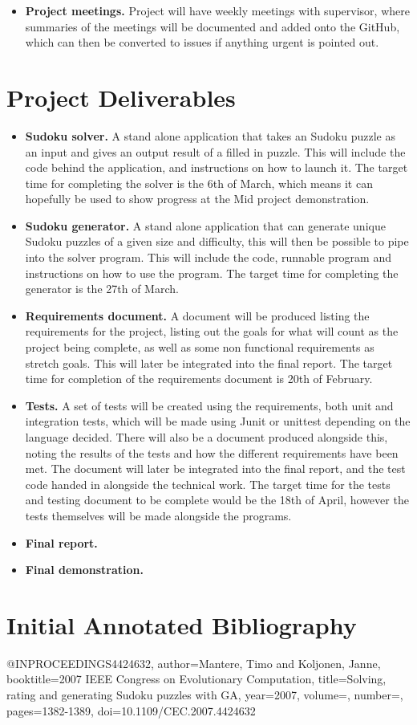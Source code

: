\documentclass[a4paper,10pt]{article}
\begin{document}
\begin{itemize}
\begin{itemize}
	\end{itemize} 
	\item \textbf{Project meetings.} Project will have weekly meetings with supervisor, where summaries of the meetings will be documented and added onto the GitHub, which can then be converted to issues if anything urgent is pointed out.
\end{itemize}
\section*{Project Deliverables}
\begin{itemize}
	\item \textbf{Sudoku solver.} A stand alone application that takes an Sudoku puzzle as an input and gives an output result of a filled in puzzle. This will include the code behind the application, and instructions on how to launch it. The target time for completing the solver is the 6th of March, which means it can hopefully be used to show progress at the Mid project demonstration.
	\item \textbf{Sudoku generator.} A stand alone application that can generate unique Sudoku puzzles of a given size and difficulty, this will then be possible to pipe into the solver program. This will include the code, runnable program and instructions on how to use the program. The target time for completing the generator is the 27th of March.
	\item \textbf{Requirements document.} A document will be produced listing the requirements for the project, listing out the goals for what will count as the project being complete, as well as some non functional requirements as stretch goals. This will later be integrated into the final report. The target time for completion of the requirements document is 20th of February.
	\item \textbf{Tests.} A set of tests will be created using the requirements, both unit and integration tests, which will be made using Junit or unittest depending on the language decided. There will also be a document produced alongside this, noting the results of the tests and how the different requirements have been met. The document will later be integrated into the final report, and the test code handed in alongside the technical work. The target time for the tests and testing document to be complete would be the 18th of April, however the tests themselves will be made alongside the programs.
	\item \textbf{Final report.}
	\item \textbf{Final demonstration.}
\end{itemize}

\section*{Initial Annotated Bibliography}
@INPROCEEDINGS{4424632,
	author={Mantere, Timo and Koljonen, Janne},
	booktitle={2007 IEEE Congress on Evolutionary Computation}, 
	title={Solving, rating and generating Sudoku puzzles with GA}, 
	year={2007},
	volume={},
	number={},
	pages={1382-1389},
	doi={10.1109/CEC.2007.4424632}}\\
\end{document}
